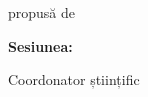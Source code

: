 \begin{titlepage}
    \begin{center}
        \large
        \MakeUppercase{\university}
        
        \LARGE
        \textbf{\MakeUppercase{\faculty}}
    
        
        \vspace{1cm}
        \Large
        \MakeUppercase{\thesistype}
        
        \vspace{0.5cm}
        \LARGE
        \textbf{\thesistitle}
        
        \vspace{2cm}
        \Large
        propusă de
        
        \vspace{0.5cm}
        \LARGE
        \textbf{\authornamefl}
        
        \vfill
        \Large
        \textbf{Sesiunea:} \session
        
        \vspace{2cm}
        \Large
        Coordonator științific
        
        \vspace{0.5cm}
        \LARGE
        \textbf{\coordinator}
    \end{center}
\end{titlepage}